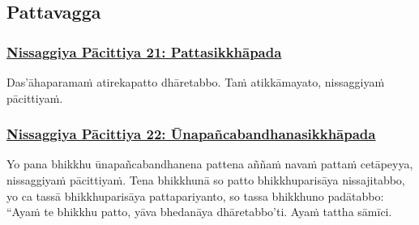 \subsection{Pattavagga}
\label{np-vagga3}

\subsubsection*{\hyperref[forf-exp21]{Nissaggiya Pācittiya 21: Pattasikkhāpada}}
\label{np21}

Das'āhaparamaṁ atirekapatto dhāretabbo. Taṁ atikkāmayato, nissaggiyaṁ pācittiyaṁ.



\subsubsection*{\hyperref[forf-exp22]{Nissaggiya Pācittiya 22: Ūnapañcabandhanasikkhāpada}}
\label{np22}

Yo pana bhikkhu ūnapañcabandhanena\makeatletter\hyperlink{endnote198-appendix}\makeatother{} pattena aññaṁ navaṁ pattaṁ cetāpeyya, nissaggiyaṁ pācittiyaṁ. Tena bhikkhunā so patto bhikkhuparisāya nissajitabbo,\makeatletter\hyperlink{endnote199-appendix}\makeatother{} yo ca tassā bhikkhuparisāya pattapariyanto, so\makeatletter\hyperlink{endnote200-appendix}\makeatother{} tassa bhikkhuno padātabbo: ``Ayaṁ te\makeatletter\hyperlink{endnote201-appendix}\makeatother{} bhikkhu patto, yāva bhedanāya dhāretabbo'ti. Ayaṁ tattha sāmīci.



